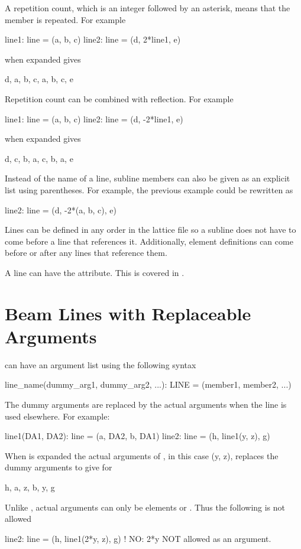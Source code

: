 A repetition count, which is an integer followed by an asterisk, 
means that the member is
repeated. For example
\begin{example}
  line1: line = (a, b, c)
  line2: line = (d, 2*line1, e)
\end{example}
 when expanded gives
\begin{example}
  d, a, b, c, a, b, c, e
\end{example}
Repetition count can be combined with reflection. For example
\begin{example}
  line1: line = (a, b, c)
  line2: line = (d, -2*line1, e)
\end{example}
 when expanded gives
\begin{example}
  d, c, b, a, c, b, a, e
\end{example}
Instead of the name of a line, subline members can also be given as an explicit 
list using parentheses. For example, the previous example could be rewritten as
\begin{example}
  line2: line = (d, -2*(a, b, c), e)
\end{example}

Lines can be defined in any order in the lattice file so a subline
does not have to come before a line that references it. Additionally,
element definitions can come before or after any lines that reference
them.

A line can have the  attribute. This is covered in
.

\section{Beam Lines with Replaceable Arguments}
\label{s:lines.with.arg}

 can have an argument list using the following syntax
\begin{example}
  line_name(dummy_arg1, dummy_arg2, ...): LINE = (member1, member2, ...)
\end{example}
The dummy arguments are replaced by the actual arguments when the line is used
elsewhere. For example:
\begin{example}
  line1(DA1, DA2): line = (a, DA2, b, DA1)
  line2: line = (h, line1(y, z), g)
\end{example}
When  is expanded the actual arguments of , in this
case \vn(y, z), replaces the dummy arguments  to give for
\begin{example}
  h, a, z, b, y, g
\end{example} 
Unlike \mad,  actual arguments can only be elements or . 
Thus the following is not allowed
\begin{example}
  line2: line = (h, line1(2*y, z), g)   ! NO: 2*y NOT allowed as an argument.
\end{example}

